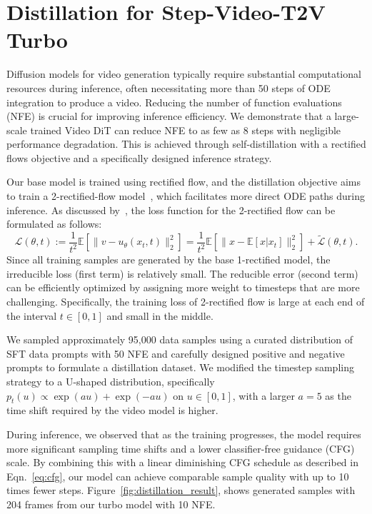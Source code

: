 \section{Distillation for Step-Video-T2V Turbo}
Diffusion models for video generation typically require substantial computational resources during inference, often necessitating more than 50 steps of ODE integration to produce a video. Reducing the number of function evaluations (NFE) is crucial for improving inference efficiency. We demonstrate that a large-scale trained Video DiT can reduce NFE to as few as 8 steps with negligible performance degradation. This is achieved through self-distillation with a rectified flows objective and a specifically designed inference strategy.

Our base model is trained using rectified flow, and the distillation objective aims to train a 2-rectified-flow model~\citep{Liu2022FlowSA}, which facilitates more direct ODE paths during inference. As discussed by~\cite{lee2024improving}, the loss function for the 2-rectified flow can be formulated as follows:
\begin{equation}
\mathcal{L}(\theta, t) := \frac{1}{t^2} \mathbb{E}[\|v - u_\theta(x_t, t)\|_2^2] = \frac{1}{t^2} \mathbb{E}[\|x - \mathbb{E}[x|x_t]\|_2^2] + \tilde{\mathcal{L}}(\theta, t). 
\end{equation}
Since all training samples are generated by the base 1-rectified model, the irreducible loss (first term) is relatively small. The reducible error (second term) can be efficiently optimized by assigning more weight to timesteps that are more challenging. Specifically, the training loss of 2-rectified flow is large at each end of the interval \( t \in [0, 1] \) and small in the middle.

We sampled approximately 95,000 data samples using a curated distribution of SFT data prompts with 50 NFE and carefully designed positive and negative prompts to formulate a distillation dataset. We modified the timestep sampling strategy to a U-shaped distribution, specifically \( p_t(u) \propto \exp(a u) + \exp(-a u) \) on \( u \in [0, 1] \), with a larger \( a = 5 \) as the time shift required by the video model is higher.

During inference, we observed that as the training progresses, the model requires more significant sampling time shifts and a lower classifier-free guidance (CFG) scale. By combining this with a linear diminishing CFG schedule as described in Eqn.~\ref{eq:cfg}, our model can achieve comparable sample quality with up to 10 times fewer steps. Figure~\ref{fig:distillation_result}, shows generated samples with 204 frames from our turbo model with 10 NFE.

